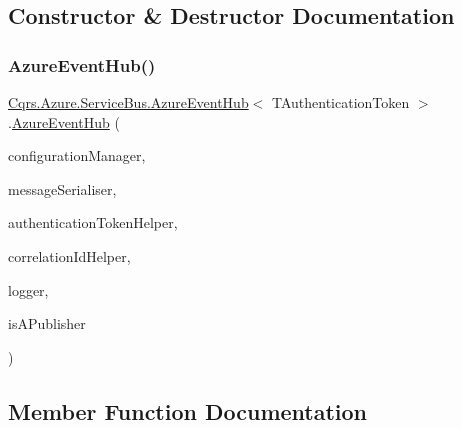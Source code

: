 \subsection{Constructor \& Destructor Documentation}
\mbox{\label{classCqrs_1_1Azure_1_1ServiceBus_1_1AzureEventHub_adef2c26639ae4a7725c397da7fd90000_adef2c26639ae4a7725c397da7fd90000}} 
\subsubsection{\texorpdfstring{Azure\+Event\+Hub()}{AzureEventHub()}}
{\footnotesize\ttfamily \hyperlink{classCqrs_1_1Azure_1_1ServiceBus_1_1AzureEventHub}{Cqrs.\+Azure.\+Service\+Bus.\+Azure\+Event\+Hub}$<$ T\+Authentication\+Token $>$.\hyperlink{classCqrs_1_1Azure_1_1ServiceBus_1_1AzureEventHub}{Azure\+Event\+Hub} (\begin{DoxyParamCaption}\item[{\hyperlink{interfaceCqrs_1_1Configuration_1_1IConfigurationManager}{I\+Configuration\+Manager}}]{configuration\+Manager,  }\item[{\hyperlink{interfaceCqrs_1_1Azure_1_1ServiceBus_1_1IMessageSerialiser}{I\+Message\+Serialiser}$<$ T\+Authentication\+Token $>$}]{message\+Serialiser,  }\item[{\hyperlink{interfaceCqrs_1_1Authentication_1_1IAuthenticationTokenHelper}{I\+Authentication\+Token\+Helper}$<$ T\+Authentication\+Token $>$}]{authentication\+Token\+Helper,  }\item[{I\+Correlation\+Id\+Helper}]{correlation\+Id\+Helper,  }\item[{I\+Logger}]{logger,  }\item[{bool}]{is\+A\+Publisher }\end{DoxyParamCaption})\hspace{0.3cm}{\ttfamily [protected]}}



\subsection{Member Function Documentation}
\mbox{\label{classCqrs_1_1Azure_1_1ServiceBus_1_1AzureEventHub_af2efc497815828b6fe0b4d6621bc8b41_af2efc497815828b6fe0b4d6621bc8b41}} 
